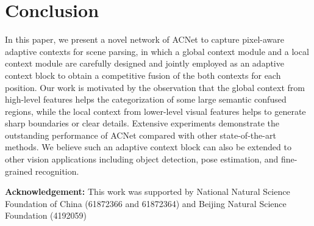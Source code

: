 \documentclass[10pt,twocolumn,letterpaper]{article}
\begin{document}
\section{Conclusion}
In this paper, we present a novel network of ACNet to capture pixel-aware adaptive contexts for scene parsing, in which a global context module and a local context module are carefully designed and jointly employed as an adaptive context block to obtain a competitive fusion of the both contexts for each position. Our work is motivated by the observation that the global context from high-level features helps the categorization of some large semantic confused regions, while the local context from lower-level visual features helps to generate sharp boundaries or clear details. 
Extensive experiments demonstrate the outstanding performance of ACNet compared with other state-of-the-art methods. We believe such an adaptive context block can also be extended to other vision applications including object detection, pose estimation, and fine-grained recognition. 



\noindent\textbf{Acknowledgement:} This work was supported by National Natural Science Foundation of China (61872366 and 61872364) and Beijing Natural Science Foundation (4192059)
{\small


}
\end{document}
